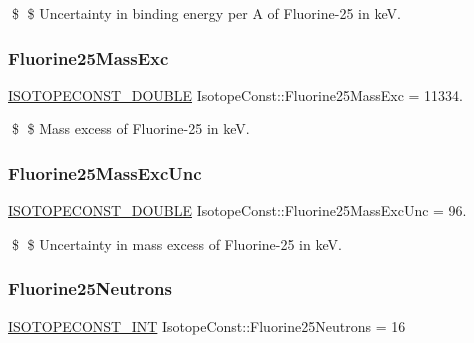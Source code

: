 \$ \$ Uncertainty in binding energy per A of Fluorine-\/25 in keV. \mbox{\label{group___isotope_const-_fluorine-_f25_gaa97dfecbcbab6a32f53f58ea5f2cb4ca}} 
\subsubsection{\texorpdfstring{Fluorine25\+Mass\+Exc}{Fluorine25MassExc}}
{\footnotesize\ttfamily \mbox{\hyperlink{group___isotope_const-_macros_ga8f45a7272ce02c0b4c65c44636ed719a}{I\+S\+O\+T\+O\+P\+E\+C\+O\+N\+S\+T\+\_\+\+D\+O\+U\+B\+LE}} Isotope\+Const\+::\+Fluorine25\+Mass\+Exc = 11334.}

\$ \$ Mass excess of Fluorine-\/25 in keV. \mbox{\label{group___isotope_const-_fluorine-_f25_gaf3cfc07e805c02d8fa5a39b6c481d2ce}} 
\subsubsection{\texorpdfstring{Fluorine25\+Mass\+Exc\+Unc}{Fluorine25MassExcUnc}}
{\footnotesize\ttfamily \mbox{\hyperlink{group___isotope_const-_macros_ga8f45a7272ce02c0b4c65c44636ed719a}{I\+S\+O\+T\+O\+P\+E\+C\+O\+N\+S\+T\+\_\+\+D\+O\+U\+B\+LE}} Isotope\+Const\+::\+Fluorine25\+Mass\+Exc\+Unc = 96.}

\$ \$ Uncertainty in mass excess of Fluorine-\/25 in keV. \mbox{\label{group___isotope_const-_fluorine-_f25_ga41d3e9793693d29a8541f026261ee454}} 
\subsubsection{\texorpdfstring{Fluorine25\+Neutrons}{Fluorine25Neutrons}}
{\footnotesize\ttfamily \mbox{\hyperlink{group___isotope_const-_macros_ga5f18360b3e99483a35c32d789e62621c}{I\+S\+O\+T\+O\+P\+E\+C\+O\+N\+S\+T\+\_\+\+I\+NT}} Isotope\+Const\+::\+Fluorine25\+Neutrons = 16}

